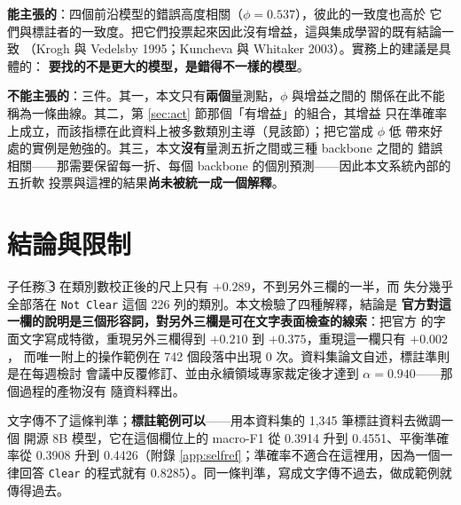 \documentclass[11pt,a4paper]{ctexart}
\newcommand{\fn}[1]{\texttt{#1}}
\begin{document}
\begin{tcolorbox}[colback=gray!8, colframe=gray!55, title=能主張的與不能主張的]
\textbf{能主張的}：四個前沿模型的錯誤高度相關（$\phi = 0.537$），彼此的一致度也高於
它們與標註者的一致度。把它們投票起來因此沒有增益，這與集成學習的既有結論一致
（Krogh 與 Vedelsby 1995；Kuncheva 與 Whitaker 2003）。實務上的建議是具體的：
\textbf{要找的不是更大的模型，是錯得不一樣的模型}。

\medskip
\textbf{不能主張的}：三件。其一，本文只有\textbf{兩個}量測點，$\phi$ 與增益之間的
關係在此不能稱為一條曲線。其二，第 \ref{sec:act} 節那個「有增益」的組合，其增益
只在準確率上成立，而該指標在此資料上被多數類別主導（見該節）；把它當成 $\phi$ 低
帶來好處的實例是勉強的。其三，本文\textbf{沒有}量測五折之間或三種 backbone 之間的
錯誤相關——那需要保留每一折、每個 backbone 的個別預測——因此本文系統內部的五折軟
投票與這裡的結果\textbf{尚未被統一成一個解釋}。
\end{tcolorbox}

\section{結論與限制}

子任務 \textcircled{3} 在類別數校正後的尺上只有 $+0.289$，不到另外三欄的一半，而
失分幾乎全部落在 \fn{Not Clear} 這個 226 列的類別。本文檢驗了四種解釋，結論是
\textbf{官方對這一欄的說明是三個形容詞，對另外三欄是可在文字表面檢查的線索}：把官方
的字面文字寫成特徵，重現另外三欄得到 $+0.210$ 到 $+0.375$，重現這一欄只有 $+0.002$，
而唯一附上的操作範例在 742 個段落中出現 0 次。資料集論文自述，標註準則是在每週檢討
會議中反覆修訂、並由永續領域專家裁定後才達到 $\alpha=0.940$——那個過程的產物沒有
隨資料釋出。

\medskip
文字傳不了這條判準；\textbf{標註範例可以}——用本資料集的 1,345 筆標註資料去微調一個
開源 8B 模型，它在這個欄位上的 macro-F1 從 0.3914 升到 0.4551、平衡準確率從 0.3908
升到 0.4426（附錄 \ref{app:selfref}；準確率不適合在這裡用，因為一個一律回答
\fn{Clear} 的程式就有 0.8285）。同一條判準，寫成文字傳不過去，做成範例就傳得過去。
\end{document}
